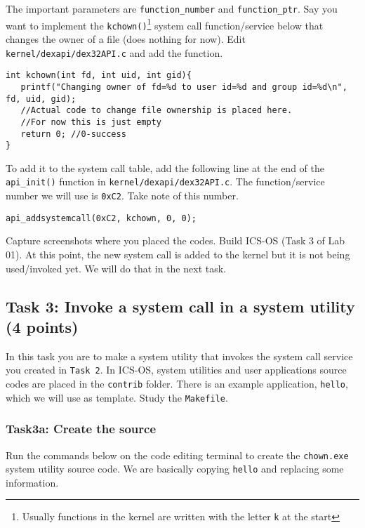 \documentclass[a4paper, 11pt,oneside]{article}
\begin{document}
The important parameters are \texttt{function\_number} and 
\texttt{function\_ptr}. Say you want to implement the 
\texttt{kchown()}\footnote{Usually functions in the kernel are written with the 
letter \texttt{k} at the start} system call function/service below that changes 
the owner of a file (does nothing for now). Edit  
\texttt{kernel/dexapi/dex32API.c} and add the function.

\begin{verbatim}
int kchown(int fd, int uid, int gid){
   printf("Changing owner of fd=%d to user id=%d and group id=%d\n", fd, uid, gid);
   //Actual code to change file ownership is placed here.
   //For now this is just empty   
   return 0; //0-success
}
\end{verbatim}

To add it to the system call table, add the following line at the end of the 
\texttt{api\_init()} function in \newline 
\texttt{kernel/dexapi/dex32API.c}. The function/service number we will use is 
\texttt{0xC2}. Take note of this number.

\begin{verbatim}
api_addsystemcall(0xC2, kchown, 0, 0);
\end{verbatim}

Capture screenshots where you placed the codes. 
Build ICS-OS (Task 3 of Lab 01). At this point, the new system call is added to 
the kernel but it 
is not being used/invoked yet. We will do that in the next task. 

\subsection*{Task 3: Invoke a system call in a system utility (4 points)}
In this task you are to make a system utility that invokes the system call 
service you created in \texttt{Task 2}. In ICS-OS, system utilities  and user 
applications source codes are placed in the \texttt{contrib} folder. There is 
an example application, \texttt{hello}, which we will use as template. Study 
the \texttt{Makefile}. 

\subsubsection*{Task3a: Create the source}
Run the commands below on the code editing terminal to create the  
\texttt{chown.exe} system utility source code. We are basically copying 
\texttt{hello} and replacing some information.
\end{document}
